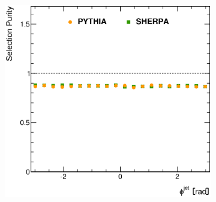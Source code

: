 \documentclass[12pt, twoside]{article}
\numberwithin{equation}{section}
\numberwithin{figure}{section}
\newenvironment{changemargin}[2]{%
\begin{list}{}{%
\setlength{\topsep}{0pt}%
\setlength{\leftmargin}{#1}%
\setlength{\rightmargin}{#2}%
\setlength{\listparindent}{\parindent}%
\setlength{\itemindent}{\parindent}%
\setlength{\parsep}{\parskip}%
}%
\item[]}{\end{list}}
\begin{document}
\begin{figure}
\begin{changemargin}{-1.0cm}{-0.75cm}
\begin{changemargin}{-0.75cm}{-1.0cm}
\begin{subfigure}[b]{0.37\textwidth}
            \subcaption{}
            \label{fig:SelectionPuritiesRapidityJet}
        \end{subfigure}
        \begin{subfigure}[b]{0.37\textwidth}
            \includegraphics[width=\textwidth]{./images/SelectionPurities/PUR-106.eps}
            \subcaption{}
            \label{fig:SelectionPuritiesPhiJet}
        \end{subfigure}


\end{changemargin}
\end{changemargin}
\end{figure}
\end{document}
